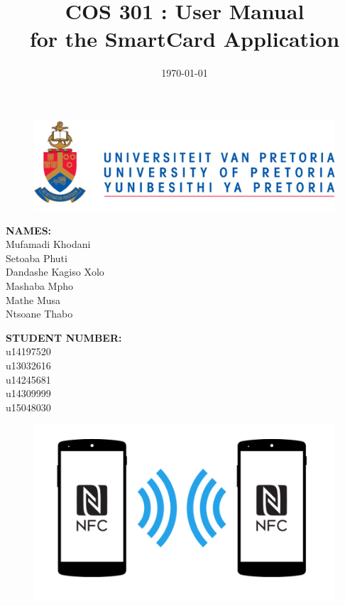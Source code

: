 \documentclass[english]{article}
\title{COS 301 : User Manual\\
	for the SmartCard Application\\
	}
\date{\today}
\begin{document}
	\maketitle
	\begin{figure}[!t]
		\includegraphics{up_logo.png}
	\end{figure}
	\begin{minipage}{0.4\textwidth}
		\begin{flushleft} \large
			\textbf{NAMES:}\\[0.4cm]
			Mufamadi {Khodani} \\
			Setoaba {Phuti} \\
			Dandashe {Kagiso Xolo} \\
			Mashaba {Mpho} \\
			Mathe {Musa} \\
			Ntsoane {Thabo}\\
		\end{flushleft}
	\end{minipage}
	\begin{minipage}{0.4\textwidth}
		\begin{flushright} \large
			\textbf{STUDENT NUMBER:} \\[0.4cm]
			u14197520 \\
			u13032616 \\
			u14245681 \\
			u14309999 \\
			u15048030 \\
		\end{flushright}
\end{minipage}

	
	\newpage

	\tableofcontents
	

	
\newpage
	\begin{figure}[!t]
		\centering
		\includegraphics[scale=0.6]{NFC.png}
	\end{figure}
\end{document}
